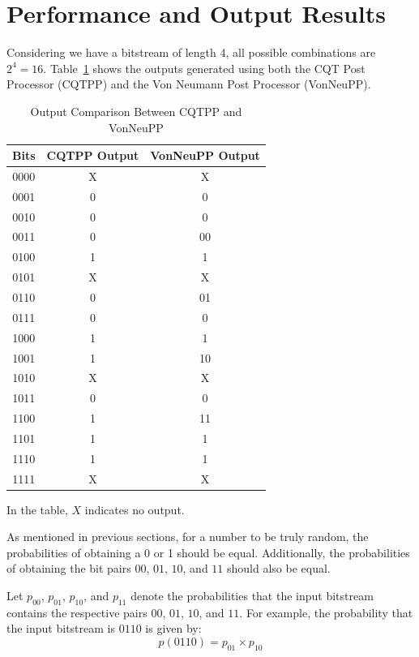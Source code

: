 \section{Performance and Output Results}

Considering we have a bitstream of length 4, all possible combinations are \(2^4 = 16\). Table~\ref{tab:output_comparison} shows the outputs generated using both the CQT Post Processor (CQTPP) and the Von Neumann Post Processor (VonNeuPP).

\begin{table}[h]
\centering
\caption{Output Comparison Between CQTPP and VonNeuPP}
\label{tab:output_comparison}
\begin{tabular}{|c|c|c|}
\hline
\textbf{Bits} & \textbf{CQTPP Output} & \textbf{VonNeuPP Output} \\ \hline
0000 & X  & X  \\ \hline
0001 & 0  & 0  \\ \hline
0010 & 0  & 0  \\ \hline
0011 & 0  & 00 \\ \hline
0100 & 1  & 1  \\ \hline
0101 & X  & X  \\ \hline
0110 & 0  & 01 \\ \hline
0111 & 0  & 0  \\ \hline
1000 & 1  & 1  \\ \hline
1001 & 1  & 10 \\ \hline
1010 & X  & X  \\ \hline
1011 & 0  & 0  \\ \hline
1100 & 1  & 11 \\ \hline
1101 & 1  & 1  \\ \hline
1110 & 1  & 1  \\ \hline
1111 & X  & X  \\ \hline
\end{tabular}
\end{table}

In the table, \(X\) indicates no output.

As mentioned in previous sections, for a number to be truly random, the probabilities of obtaining a 0 or 1 should be equal. Additionally, the probabilities of obtaining the bit pairs \(00\), \(01\), \(10\), and \(11\) should also be equal.

Let \(p_{00}\), \(p_{01}\), \(p_{10}\), and \(p_{11}\) denote the probabilities that the input bitstream contains the respective pairs \(00\), \(01\), \(10\), and \(11\). For example, the probability that the input bitstream is \(0110\) is given by:
\[
p(\text{0110}) = p_{01} \times p_{10}
\]


